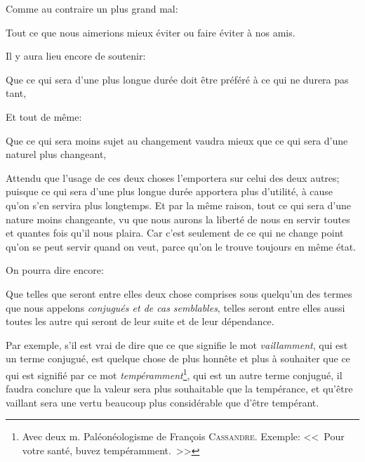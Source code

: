 Comme au contraire un plus grand mal:

\begin{emphpar}
	Tout ce que nous aimerions mieux éviter ou faire éviter à nos amis.
\end{emphpar}

\bigbreak

Il y aura lieu encore de soutenir:

\begin{emphpar}
	Que ce qui sera d'une plus longue durée doit être préféré à ce qui ne durera pas tant,
\end{emphpar}

Et tout de même:

\begin{emphpar}
	Que ce qui sera moins sujet au changement vaudra mieux que ce qui sera d'une naturel plus changeant,
\end{emphpar}

Attendu que l'usage de ces deux choses l'emportera sur celui des deux autres; puisque ce qui sera d'une plus
longue durée apportera plus d'utilité, à cause qu'on s'en servira plus longtemps. Et par la même raison, tout
ce qui sera d'une nature moins changeante, vu que nous aurons la liberté de nous en servir toutes et quantes
fois qu'il nous plaira. Car c'est seulement de ce qui ne change point qu'on se peut servir quand on veut, parce
qu'on le trouve toujours en même état.

\bigbreak

On pourra dire encore:

\begin{emphpar}
	Que telles que seront entre elles deux chose comprises sous quelqu'un des termes que nous appelons \emph{
	conjugués et de cas semblables}, telles seront entre elles aussi toutes les autre qui seront de leur suite
	et de leur dépendance.
\end{emphpar}

Par exemple, s'il est vrai de dire que ce que signifie le mot \emph{vaillamment}, qui est un terme conjugué, est
quelque chose de plus honnête et plus à souhaiter que ce qui est signifié par ce mot \emph{tempéramment}\footnote{
Avec deux m. Paléonéologisme de François \textsc{Cassandre}. Exemple: <<~Pour votre santé, buvez tempéramment.~>>},
qui est un autre terme conjugué, il faudra conclure que la valeur sera plus souhaitable que la tempérance, et qu'être
vaillant sera une vertu beaucoup plus considérable que d'être tempérant.

\bigbreak


